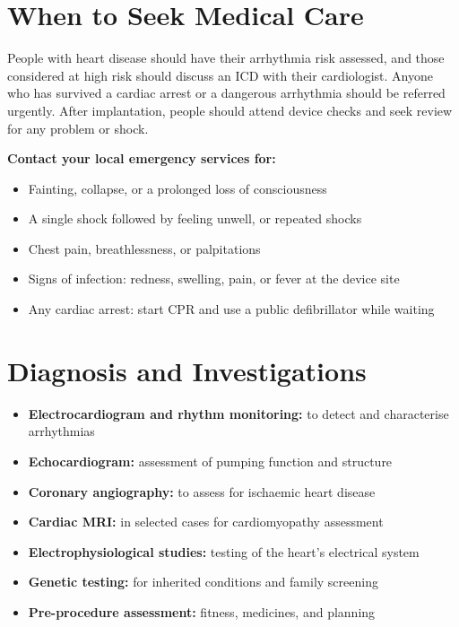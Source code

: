 \section*{When to Seek Medical Care}
People with heart disease should have their arrhythmia risk assessed, and those considered at high risk should discuss an ICD with their cardiologist. Anyone who has survived a cardiac arrest or a dangerous arrhythmia should be referred urgently. After implantation, people should attend device checks and seek review for any problem or shock.

\textbf{Contact your local emergency services for:}
\begin{itemize}
    \item Fainting, collapse, or a prolonged loss of consciousness
    \item A single shock followed by feeling unwell, or repeated shocks
    \item Chest pain, breathlessness, or palpitations
    \item Signs of infection: redness, swelling, pain, or fever at the device site
    \item Any cardiac arrest: start CPR and use a public defibrillator while waiting
\end{itemize}

\section*{Diagnosis and Investigations}
\begin{itemize}
    \item \textbf{Electrocardiogram and rhythm monitoring:} to detect and characterise arrhythmias
    \item \textbf{Echocardiogram:} assessment of pumping function and structure
    \item \textbf{Coronary angiography:} to assess for ischaemic heart disease
    \item \textbf{Cardiac MRI:} in selected cases for cardiomyopathy assessment
    \item \textbf{Electrophysiological studies:} testing of the heart's electrical system
    \item \textbf{Genetic testing:} for inherited conditions and family screening
    \item \textbf{Pre-procedure assessment:} fitness, medicines, and planning
\end{itemize}

